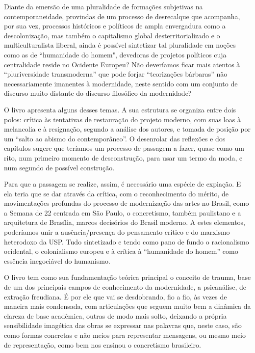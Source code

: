\begin{multicols}{2}
Diante da emersão de uma pluralidade de formações subjetivas na
contemporaneidade, provindas de um processo de desrecalque que
acompanha, por sua vez, processos históricos e políticos de ampla
envergadura como a descolonização, mas também o capitalismo global
desterritorializado e o multiculturalista liberal, ainda é possível
sintetizar tal pluralidade em noções como as de ``humanidade do homem",
devedoras de projetos políticos cuja centralidade reside no Ocidente
Europeu? Não deveríamos ficar mais atentos à ``pluriversidade
transmoderna'' que pode forjar ``teorizações bárbaras'' não
necessariamente imanentes à modernidade, neste sentido com um conjunto
de discurso muito distante do discurso filosófico da modernidade?

O livro apresenta alguns desses temas. A sua estrutura se organiza entre
dois polos: crítica às tentativas de restauração do projeto moderno, com
suas loas à melancolia e à resignação, segundo a análise dos autores, e
tomada de posição por um ``salto ao abismo do contemporâneo''. O
desenrolar das reflexões e dos capítulos sugere que teríamos um processo
de passagem a fazer, quase como um rito, num primeiro momento de
desconstrução, para usar um termo da moda, e num segundo de possível
construção.

Para que a passagem se realize, assim, é necessário uma espécie de
expiação. E ela teria que se dar através da crítica, com o
reconhecimento do mérito, de movimentações profundas do processo de
modernização das artes no Brasil, como a Semana de 22 centrada em São
Paulo, o concretismo, também paulistano e a arquitetura de Brasília,
marcos decisórios do Brasil moderno. A estes elementos, poderíamos unir
a ausência/presença do pensamento crítico e do marxismo heterodoxo da
USP. Tudo sintetizado e tendo como pano de fundo o racionalismo
ocidental, o colonialismo europeu e à crítica à ``humanidade do homem''
como essência inegociável do humanismo.


O livro tem como sua fundamentação teórica principal o conceito de
trauma, base de um dos principais campos de conhecimento da modernidade,
a psicanálise, de extração freudiana. É por ele que vai se desdobrando,
fio a fio, às vezes de maneira mais condensada, com articulações que
seguem muito bem a dinâmica da clareza de base acadêmica, outras de modo
mais solto, deixando a própria sensibilidade imagética das obras se
expressar nas palavras que, neste caso, são como formas concretas e não
meios para representar mensagens, ou mesmo meio de representação, como
bem nos ensinou o concretismo brasileiro.


\end{multicols}
